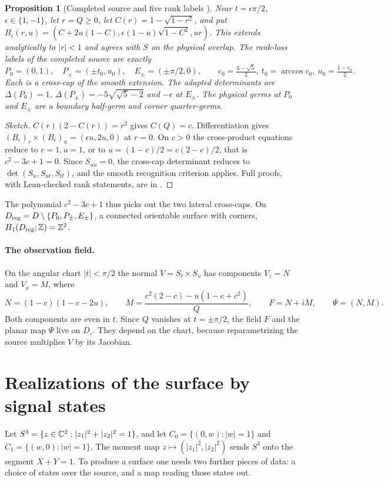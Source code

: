 \documentclass[11pt]{article}
\newtheorem{proposition}[theorem]{Proposition}
\theoremstyle{definition}\newtheorem{definition}[theorem]{Definition}
\theoremstyle{remark}\newtheorem{remark}[theorem]{Remark}
\begin{document}
\begin{proposition}[Completed source and five rank labels \cite{ruled}]\label{prop:atlas}
Near $t=\epsilon\pi/2$, $\epsilon\in\{1,-1\}$, let $r=Q\geq0$, let
$C(r)=1-\sqrt{1-r^2}$, and put
$B_\epsilon(r,u)=(C+2u(1-C),\epsilon(1-u)\sqrt{1-C^2},ur)$. This extends
analytically to $|r|<1$ and agrees with $S$ on the physical overlap. The
rank-loss labels of the completed source are exactly
\[
 P_0=(0,1),\quad P_\pm=(\pm t_0,u_0),\quad E_\pm=(\pm\pi/2,0),\qquad
 c_0=\tfrac{3-\sqrt5}{2},\ t_0=\arccos c_0,\ u_0=\tfrac{1-c_0}{2}.
\]
Each is a cross-cap of the smooth extension. The adapted determinants are
$\Delta(P_0)=1$, $\Delta(P_\pm)=-5\sqrt{\sqrt5-2}$ and $-\epsilon$ at $E_\pm$.
The physical germs at $P_0$ and $E_\pm$ are a boundary half-germ and corner
quarter-germs.
\end{proposition}
\begin{proof}[Sketch]
$C(r)(2-C(r))=r^2$ gives $C(Q)=c$. Differentiation gives
$(B_\epsilon)_r\times(B_\epsilon)_u=(\epsilon u,2u,0)$ at $r=0$. On $c>0$ the
cross-product equations reduce to $c=1,u=1$, or to $u=(1-c)/2=c(2-c)/2$, that
is $c^2-3c+1=0$. Since $S_{uu}=0$, the cross-cap determinant reduces to
$\det(S_u,S_{ut},S_{tt})$, and the smooth recognition criterion
\cite[Cor.~4.5]{hasegawa} applies. Full proofs, with Lean-checked rank
statements, are in \cite{ruled}.
\end{proof}
The polynomial $c^2-3c+1$ thus picks out the two lateral cross-caps. On
$D_{\rm reg}=D\setminus\{P_0,P_\pm,E_\pm\}$, a connected orientable surface
with corners, $H_1(D_{\rm reg};\mathbb Z)=\mathbb Z^2$.

\paragraph{The observation field.} On the angular chart $|t|<\pi/2$ the normal
$V=S_t\times S_u$ has components $V_z=N$ and $V_x=M$, where
\begin{equation}\label{eq:F}
 N=(1-c)(1-c-2u),\qquad
 M=\frac{c^2(2-c)-u(1-c+c^2)}{Q},\qquad F=N+iM,\qquad \Psi=(N,M).
\end{equation}
Both components are even in $t$. Since $Q$ vanishes at $t=\pm\pi/2$, the
field $F$ and the planar map $\Psi$ live on $D_\circ$. They depend on the
chart, because reparametrizing the source multiplies $V$ by its Jacobian.

\section{Realizations of the surface by signal states}\label{sec:realization}
Let $S^3=\{z\in\mathbb C^2:|z_1|^2+|z_2|^2=1\}$, and let $C_0=\{(0,w):|w|=1\}$ and
$C_1=\{(w,0):|w|=1\}$. The moment map $z\mapsto(|z_1|^2,|z_2|^2)$ sends $S^3$
onto the segment $X+Y=1$. To produce a surface one needs two further pieces
of data: a choice of states over the source, and a map reading those states
out.
\end{document}
